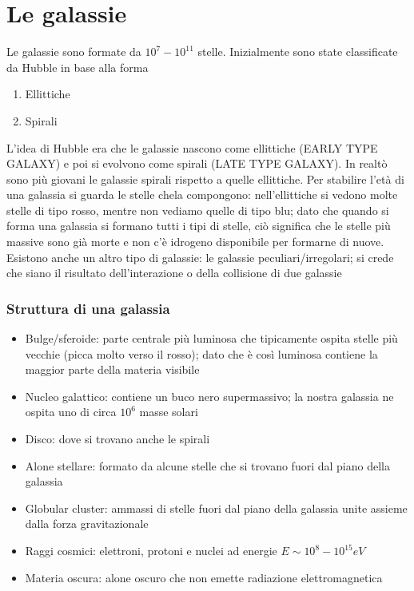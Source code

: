 \chapter{Le galassie}

Le galassie sono formate da \(10^7-10^{11}\) stelle. 
Inizialmente sono state classificate da Hubble in base alla forma
\begin{enumerate}
    \item Ellittiche
    \item Spirali
\end{enumerate}
L'idea di Hubble era che le galassie nascono come ellittiche (EARLY TYPE GALAXY) e poi si evolvono come spirali (LATE TYPE GALAXY). 
In realtò sono più giovani le galassie spirali rispetto a quelle ellittiche. 
Per stabilire l'età di una galassia si guarda le stelle chela compongono: 
nell'ellittiche si vedono molte stelle di tipo rosso, mentre non vediamo quelle di tipo blu; dato che quando si forma una galassia si formano tutti i tipi di stelle, ciò significa che le stelle più massive sono già morte e non c'è idrogeno disponibile per formarne di nuove. \newline
Esistono anche  un altro tipo di galassie: le galassie peculiari/irregolari;
si crede che siano il risultato dell'interazione o della collisione di due galassie

\subsection*{Struttura di una galassia}

\begin{itemize}
    \item Bulge/sferoide: parte centrale più luminosa che tipicamente ospita stelle più vecchie (picca molto verso il rosso); dato che è così luminosa contiene la maggior parte della materia visibile
    \item Nucleo galattico: contiene un buco nero supermassivo; la nostra galassia ne ospita uno di circa \(10^6\) masse solari
    \item Disco: dove si trovano anche le spirali
    \item Alone stellare: formato da alcune stelle che si trovano fuori dal piano della galassia
    \item Globular cluster: ammassi di stelle fuori dal piano della galassia unite assieme dalla forza gravitazionale
    \item Raggi cosmici: elettroni, protoni e nuclei ad energie \(E \sim 10^8-10^{15} eV\)
    \item Materia oscura: alone oscuro che non emette radiazione elettromagnetica
\end{itemize}

